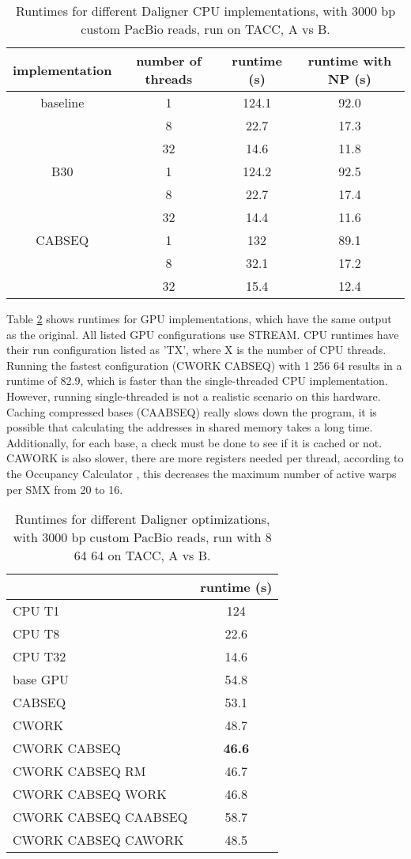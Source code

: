 \documentclass[../thesis.tex]{subfiles}
\begin{document}
\begin{table}
\centering
\caption{Runtimes for different Daligner CPU implementations, with 3000 bp custom PacBio reads, run on TACC, A vs B.}
\label{tbl:daligner1}
\begin{tabular}{c c c c}
implementation & number of threads & runtime (s) & runtime with NP (s) \\ \hline
baseline & 1 & 124.1 & 92.0 \\
& 8 & 22.7 & 17.3 \\
& 32 & 14.6 & 11.8 \\ \hline
B30 & 1 & 124.2 & 92.5 \\
& 8 & 22.7 & 17.4 \\
& 32 & 14.4 & 11.6 \\ \hline
CABSEQ & 1 & 132 & 89.1 \\
& 8 & 32.1 & 17.2 \\
& 32 & 15.4 & 12.4 \\
\end{tabular}
\end{table}

Table \ref{tbl:daligner2} shows runtimes for GPU implementations, which have the same output as the original.
All listed GPU configurations use STREAM.
CPU runtimes have their run configuration listed as 'TX', where X is the number of CPU threads.
Running the fastest configuration (CWORK CABSEQ) with 1 256 64 results in a runtime of 82.9, which is faster than the single-threaded CPU implementation.
However, running single-threaded is not a realistic scenario on this hardware.
Caching compressed bases (CAABSEQ) really slows down the program, it is possible that calculating the addresses in shared memory takes a long time.
Additionally, for each base, a check must be done to see if it is cached or not.
CAWORK is also slower, there are more registers needed per thread, according to the Occupancy Calculator \cite{occupancy_calculator}, this decreases the maximum number of active warps per SMX from 20 to 16.


\begin{table}
\centering
\caption{Runtimes for different Daligner optimizations, with 3000 bp custom PacBio reads, run with 8 64 64 on TACC, A vs B.}
\label{tbl:daligner2}
\begin{tabular}{l c}
& runtime (s) \\ \hline
CPU T1 & 124 \\
CPU T8 & 22.6 \\
CPU T32 & 14.6 \\ \hline
base GPU & 54.8 \\ 
CABSEQ & 53.1 \\
CWORK & 48.7 \\
CWORK CABSEQ & \textbf{46.6} \\
CWORK CABSEQ RM & 46.7 \\
CWORK CABSEQ WORK & 46.8 \\
CWORK CABSEQ CAABSEQ & 58.7 \\
CWORK CABSEQ CAWORK & 48.5 \\
\end{tabular}
\end{table}
\end{document}
